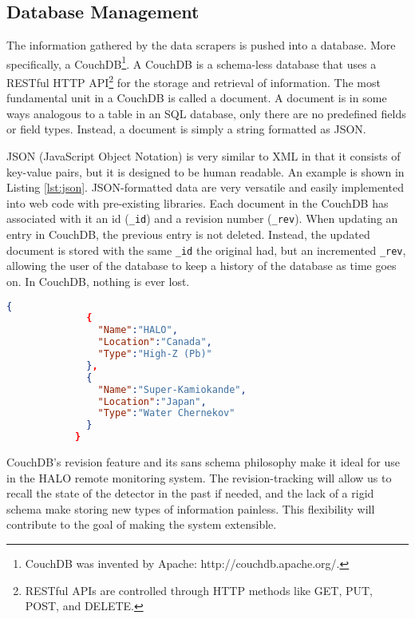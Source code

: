 		\subsection{Database Management}
		The information gathered by the data scrapers is pushed into a database. More specifically, a CouchDB\footnote{CouchDB was invented by Apache: http://couchdb.apache.org/.}. A CouchDB is a schema-less database that uses a RESTful HTTP API\footnote{RESTful APIs are controlled through HTTP methods like GET, PUT, POST, and DELETE.} for the storage and retrieval of information. The most fundamental unit in a CouchDB is called a document. A document is in some ways analogous to a table in an SQL database, only there are no predefined fields or field types. Instead, a document is simply a string formatted as JSON.

		JSON (JavaScript Object Notation) is very similar to XML in that it consists of key-value pairs, but it is designed to be human readable. An example is shown in Listing \nolinebreak \ref{lst:json}. JSON-formatted data are very versatile and easily implemented into web code with pre-existing libraries. Each document in the CouchDB has associated with it an id (\verb$_id$) and a revision number (\verb$_rev$). When updating an entry in CouchDB, the previous entry is not deleted. Instead, the updated document is stored with the same \verb$_id$ the original had, but an incremented \verb$_rev$, allowing the user of the database to keep a history of the database as time goes on. In CouchDB, nothing is ever lost. 

		\begin{lstlisting}[language=json,firstnumber=1,label=lst:json,caption=\it A JSON Example.\rm \\ Here is a short list of neutrino observatories with some descriptive attributes. This format is both human and machine readable!]
			{
			  {
			    "Name":"HALO",
			    "Location":"Canada",
			    "Type":"High-Z (Pb)"
			  },
			  {
			    "Name":"Super-Kamiokande",
			    "Location":"Japan",
			    "Type":"Water Chernekov"
			  }
			}
		\end{lstlisting}

		CouchDB's revision feature and its sans schema philosophy make it ideal for use in the HALO remote monitoring system. The revision-tracking will allow us to recall the state of the detector in the past if needed, and the lack of a rigid schema make storing new types of information painless. This flexibility will contribute to the goal of making the system extensible.

